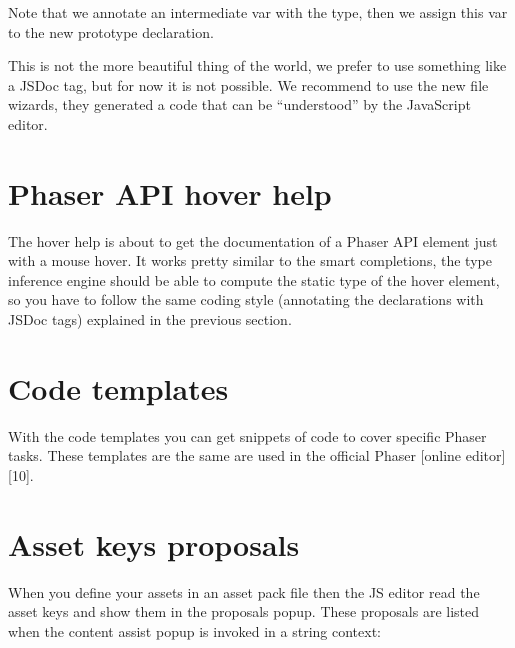 \documentclass[letterpaper,10pt,english]{sphinxmanual}
\begin{document}
\noindent{}

Note that we annotate an intermediate  var with the  type, then we assign this var to the new prototype declaration.

\begin{sphinxVerbatim}[commandchars=\\\{\}]
   
  
  
\end{sphinxVerbatim}

This is not the more beautiful thing of the world, we prefer to use something like a  JSDoc tag, but for now it is not possible. We recommend to use the new file wizards, they generated a code that can be “understood” by the JavaScript editor.


\section{Phaser API hover help}
\label{\detokenize{jseditor:phaser-api-hover-help}}
The hover help is about to get the documentation of a Phaser API element just with a mouse hover. It works pretty similar to the smart completions, the type inference engine should be able to compute the static type of the hover element, so you have to follow the same coding style (annotating the declarations with JSDoc tags) explained in the previous section.

\noindent{}


\section{Code templates}
\label{\detokenize{jseditor:code-templates}}
With the code templates you can get snippets of code to cover specific Phaser tasks. These templates are the same are used in the official Phaser {[}online editor{]}{[}10{]}.

\noindent{}


\section{Asset keys proposals}
\label{\detokenize{jseditor:asset-keys-proposals}}
When you define your assets in an asset pack file then the JS editor read the asset keys and show them in the proposals popup. These proposals are listed when the content assist popup is invoked in a string context:
\end{document}
